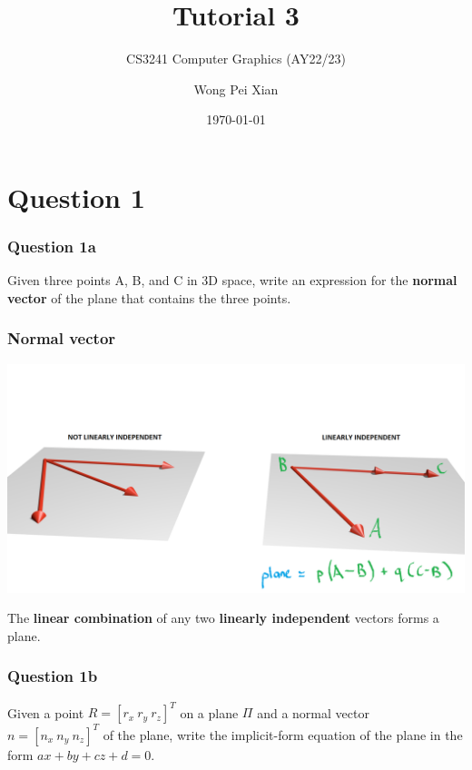\documentclass{beamer}
\title{Tutorial 3}
\subtitle{CS3241 Computer Graphics (AY22/23)}
\date{\today}
\author{Wong Pei Xian}
\institute[]{\email{e0389023@u.nus.edu}}
\begin{document}
\frame[plain]{\titlepage}

\section{Question 1}

\begin{frame}
    \frametitle{Question 1a}
    Given three points A, B, and C in 3D space, write an expression for the \textbf{normal vector}
    of the plane that contains the three points.
\end{frame}

\begin{frame}
    \frametitle{Normal vector}

    \begin{center}
        \includegraphics[scale=0.25]{1920px-Vec-dep.png}
    \end{center}

    The \textbf{linear combination} of any two \textbf{linearly independent} vectors forms a plane.

\end{frame}

\begin{frame}
    \frametitle{Question 1b}

    Given a point $R = [r_x \  r_y \  r_z]^T$ on a plane $\Pi$ and a normal vector 
    $n = [n_x \  n_y \  n_z]^T$ of the plane, write the implicit-form equation of 
    the plane in the form $ax + by + cz + d = 0$.

\end{frame}
\end{document}

